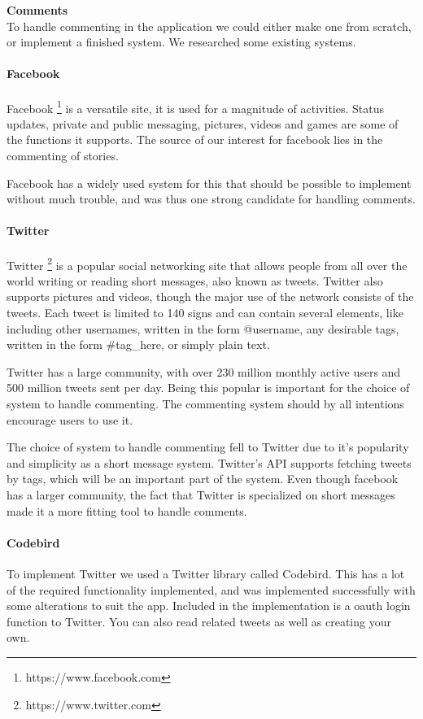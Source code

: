 \documentclass[11pt]{book}
\begin{document}
\textbf{Comments}\\
To handle commenting in the application we could either make one from scratch, or implement a finished system. We researched some existing systems.

\paragraph{Facebook}
Facebook \footnote{https://www.facebook.com} is a versatile site, it is used for a magnitude of activities. Status updates, private and public messaging, pictures, videos and games are some of the functions it supports. The source of our interest for facebook lies in the commenting of stories. 

Facebook has a widely used system for this that should be possible to implement without much trouble, and was thus one strong candidate for handling comments.

\paragraph{Twitter}
Twitter \footnote{https://www.twitter.com} is a popular social networking site that allows people from all over the world writing or reading short messages, also known as tweets. Twitter also supports pictures and videos, though the major use of the network consists of the tweets. Each tweet is limited to 140 signs and can contain several elements, like including other usernames, written in the form @username, any desirable tags, written in the form \#tag\_here, or simply plain text. 

Twitter has a large community, with over 230 million monthly active users and 500 million tweets sent per day\cite{aboutTwitter}. Being this popular is important for the choice of system to handle commenting. The commenting system should by all intentions encourage users to use it.

The choice of system to handle commenting fell to Twitter due to it’s popularity and simplicity as a short message system. Twitter’s API supports fetching tweets by tags, which will be an important part of the system. Even though facebook has a larger community, the fact that Twitter is specialized on short messages made it a more fitting tool to handle comments.

\paragraph{Codebird}
To implement Twitter we used a Twitter library called Codebird. This has a lot of the required functionality implemented, and was implemented successfully with some alterations to suit the app. Included in the implementation is a oauth login function to Twitter. You can also read related tweets as well as creating your own.
\end{document}
